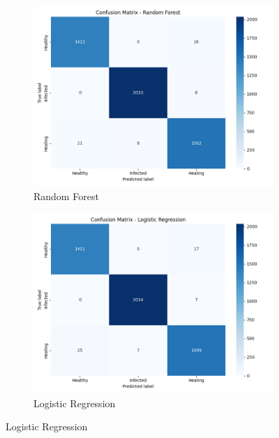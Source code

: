 \documentclass[conference]{IEEEtran}
\begin{document}
\begin{figure}[H]
    \centering
    \begin{subfigure}[b]{0.45\textwidth}
        \includegraphics[width=\textwidth]{figures/confusion_matrix_Random Forest.png}
        \caption{Random Forest}
        \label{fig:cm_rf}
    \end{subfigure}
    \begin{subfigure}[b]{0.45\textwidth}
        \includegraphics[width=\textwidth]{figures/confusion_matrix_Logistic Regression.png}
        \caption{Logistic Regression}
        \label{fig:cm_lr}
    \end{subfigure}
    
    \vspace{0.5cm}
    

\end{figure}
\end{document}

